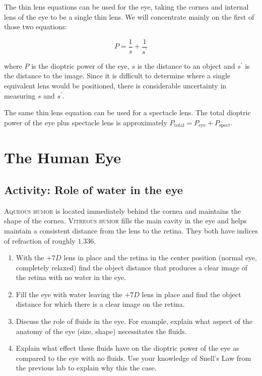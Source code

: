 The thin lens equations can be used for the eye, taking the cornea and internal lens of the eye to be a single thin lens. We will concentrate mainly on the first of those two equations:

\begin{equation}
	P = \frac{1}{s} + \frac{1}{s^{\prime}}
\end{equation}

\noindent where $P$ is the dioptric power of the eye, $s$ is the distance to an object and $s^{\prime}$ is the distance to the image. Since it is difficult to determine where a single equivalent lens would be positioned, there is considerable uncertainty in measuring $s$ and $s^{\prime}$. 

The same thin lens equation can be used for a spectacle lens. The total dioptric power of the eye plus spectacle lens is approximately
	$P_{\textrm{total}} = P_{\textrm{eye}} + P_{\textrm{spect}}$.
	 
\section{The Human Eye}

\subsection{Activity: Role of water in the eye}
\textsc{Aqueous humor} is located immediately behind the cornea and maintains the shape of the cornea.  \textsc{Vitreous humor} fills the main cavity in the eye and helps maintain a consistent distance from the lens to the retina.  They both have indices of refraction of roughly $1.336$.
\begin{enumerate}
	\item With the $+7D$ lens in place and the retina in the center position (normal eye, completely relaxed) find the object distance that produces a clear image of the retina with no water in the eye.
	\item Fill the eye with water leaving the $+7D$ lens in place and find the object distance for which there is a clear image on the retina.
	\item Discuss the role of fluids in the eye. For example, explain what aspect of the anatomy of the eye (size, shape) necessitates the fluids. 
	\item Explain what effect these fluids have on the dioptric power of the eye as compared to the eye with no fluids.  Use your knowledge of Snell's Law from the previous lab to explain why this the case.
\end{enumerate}

